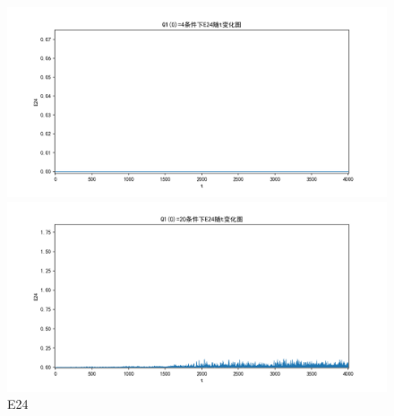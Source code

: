 \documentclass[10pt, a4paper]{article}
\begin{document}
    \begin{figure}[H]
        \begin{minipage}[t]{0.49\textwidth}
            \centering
            \includegraphics[width=\textwidth]{./q5_pics/cmp/E24.png}
        \end{minipage}
        \begin{minipage}[t]{0.49\textwidth}
            \centering
            \includegraphics[width=\textwidth]{./q5_pics/exp/E24.png}
        \end{minipage}
        \caption{E24}\label{fig:E24 in q5}
    \end{figure}
\end{document}
